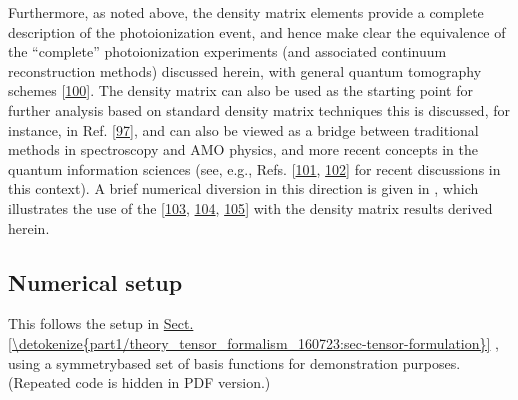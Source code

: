 \documentclass[letterpaper,table,10pt,english]{jupyterBook}
\begin{document}
\sphinxAtStartPar
Furthermore, as noted above, the density matrix elements provide a complete description of the photoionization event, and hence make clear the equivalence of the “complete” photoionization experiments (and associated continuum reconstruction methods) discussed herein, with general quantum tomography schemes {[}\hyperlink{cite.backmatter/bibliography:id780}{100}{]}. The density matrix can also be used as the starting point for further analysis based on standard density matrix techniques \sphinxhyphen{} this is discussed, for instance, in Ref. {[}\hyperlink{cite.backmatter/bibliography:id533}{97}{]}, and can also be viewed as a bridge between traditional methods in spectroscopy and AMO physics, and more recent concepts in the quantum information sciences (see, e.g., Refs. {[}\hyperlink{cite.backmatter/bibliography:id919}{101}, \hyperlink{cite.backmatter/bibliography:id982}{102}{]} for recent discussions in this context). A brief numerical diversion in this direction is given in , which illustrates the use of the  {[}\hyperlink{cite.backmatter/bibliography:id704}{103}, \hyperlink{cite.backmatter/bibliography:id705}{104}, \hyperlink{cite.backmatter/bibliography:id830}{105}{]} with the density matrix results derived herein.


\subsection{Numerical setup}
\label{\detokenize{part1/theory_density_matrices_190723-noQutip:numerical-setup}}
\sphinxAtStartPar
This follows the setup in \hyperref[\detokenize{part1/theory_tensor_formalism_160723:sec-tensor-formulation}]{Sect.\@ \ref{\detokenize{part1/theory_tensor_formalism_160723:sec-tensor-formulation}}} {\hyperref[\detokenize{part1/theory_tensor_formalism_160723:sec-tensor-formulation}]{}}, using a symmetry\sphinxhyphen{}based set of basis functions for demonstration purposes. (Repeated code is hidden in PDF version.)
\end{document}
